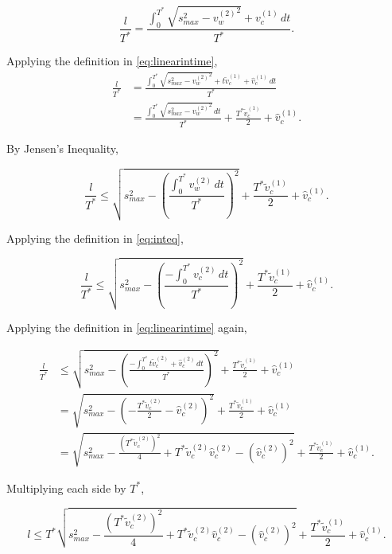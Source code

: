 \documentclass[pdflatex,sn-mathphys-num]{sn-jnl}%
\theoremstyle{thmstyleone}%
\theoremstyle{thmstyletwo}%
\theoremstyle{thmstylethree}%
\begin{document}
\begin{equation}
    \frac{l}{T^*} = \frac{\int_{0}^{T^*} \sqrt{s_{max}^2 - {v_{w}^{(2)}}^2} + v_{c}^{(1)} \,dt}{T^*}.
\end{equation}

Applying the definition in \eqref{eq:linearintime},
\begin{align}
    \frac{l}{T^*} &= \frac{\int_{0}^{T^*} \sqrt{s_{max}^2 - {v_{w}^{(2)}}^2} + t\tilde{v}_{c}^{(1)} + \hat{v}_{c}^{(1)} \,dt}{T^*}\\
    &= \frac{\int_{0}^{T^*} \sqrt{s_{max}^2 - {v_{w}^{(2)}}^2} \,dt}{T^*} + \frac{T^*\tilde{v}_{c}^{(1)}}{2} + \hat{v}_{c}^{(1)}.
\end{align}

By Jensen's Inequality,

\begin{equation}
    \frac{l}{T^*} \leq \sqrt{s_{max}^2 - \left(\frac{\int_{0}^{T^*} v_{w}^{(2)} \,dt}{T^*}\right)^2} + \frac{T^*\tilde{v}_{c}^{(1)}}{2} + \hat{v}_{c}^{(1)}.
\end{equation}

Applying the definition in \eqref{eq:inteq},

\begin{equation}
    \frac{l}{T^*} \leq \sqrt{s_{max}^2 - \left(\frac{-\int_{0}^{T^*} v_{c}^{(2)} \,dt}{T^*}\right)^2} + \frac{T^*\tilde{v}_{c}^{(1)}}{2} + \hat{v}_{c}^{(1)}.
\end{equation}

Applying the definition in \eqref{eq:linearintime} again,

\begin{align}
    \frac{l}{T^*} &\leq \sqrt{s_{max}^2 - \left(\frac{-\int_{0}^{T^*} t\tilde{v}_{c}^{(2)} + \hat{v}_{c}^{(2)} \,dt}{T^*}\right)^2} + \frac{T^*\tilde{v}_{c}^{(1)}}{2} + \hat{v}_{c}^{(1)}\\
    &= \sqrt{s_{max}^2 - \left(-\frac{T^*\tilde{v}_c^{(2)}}{2} - \hat{v}_{c}^{(2)}\right)^2} + \frac{T^*\tilde{v}_{c}^{(1)}}{2} + \hat{v}_{c}^{(1)}\\
    &= \sqrt{s_{max}^2 - \frac{\left(T^* \tilde{v}_c^{(2)}\right)^2}{4} + T^* \tilde{v}_c^{(2)} \hat{v}_c^{(2)} - \left(\hat{v}_c^{(2)}\right)^2 } + \frac{T^* \tilde{v}_c^{(1)}}{2} + \hat{v}_c^{(1)}.
\end{align}

Multiplying each side by $T^*$,

\begin{equation}
    l \leq T^*\sqrt{s_{max}^2 - \frac{\left(T^* \tilde{v}_c^{(2)}\right)^2}{4} + T^* \tilde{v}_c^{(2)} \hat{v}_c^{(2)} - \left(\hat{v}_c^{(2)}\right)^2 } + \frac{T^* \tilde{v}_c^{(1)}}{2} + \hat{v}_c^{(1)}.
\end{equation}
\end{document}
